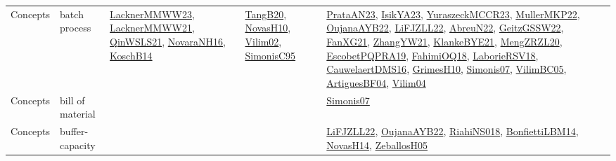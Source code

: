 {\begin{longtable}{lp{3cm}>{\raggedright}p{6cm}>{\raggedright}p{6cm}p{8cm}}
Concepts & batch process & \href{articles/LacknerMMWW23.pdf}{LacknerMMWW23}\cite{LacknerMMWW23}, \href{papers/LacknerMMWW21.pdf}{LacknerMMWW21}\cite{LacknerMMWW21}, \href{articles/QinWSLS21.pdf}{QinWSLS21}\cite{QinWSLS21}, \href{articles/NovaraNH16.pdf}{NovaraNH16}\cite{NovaraNH16}, \href{papers/KoschB14.pdf}{KoschB14}\cite{KoschB14} & \href{papers/TangB20.pdf}{TangB20}\cite{TangB20}, \href{articles/NovasH10.pdf}{NovasH10}\cite{NovasH10}, \href{papers/Vilim02.pdf}{Vilim02}\cite{Vilim02}, \href{papers/SimonisC95.pdf}{SimonisC95}\cite{SimonisC95} & \href{articles/PrataAN23.pdf}{PrataAN23}\cite{PrataAN23}, \href{articles/IsikYA23.pdf}{IsikYA23}\cite{IsikYA23}, \href{articles/YuraszeckMCCR23.pdf}{YuraszeckMCCR23}\cite{YuraszeckMCCR23}, \href{articles/MullerMKP22.pdf}{MullerMKP22}\cite{MullerMKP22}, \href{papers/OujanaAYB22.pdf}{OujanaAYB22}\cite{OujanaAYB22}, \href{papers/LiFJZLL22.pdf}{LiFJZLL22}\cite{LiFJZLL22}, \href{articles/AbreuN22.pdf}{AbreuN22}\cite{AbreuN22}, \href{papers/GeitzGSSW22.pdf}{GeitzGSSW22}\cite{GeitzGSSW22}, \href{articles/FanXG21.pdf}{FanXG21}\cite{FanXG21}, \href{articles/ZhangYW21.pdf}{ZhangYW21}\cite{ZhangYW21}, \href{papers/KlankeBYE21.pdf}{KlankeBYE21}\cite{KlankeBYE21}, \href{articles/MengZRZL20.pdf}{MengZRZL20}\cite{MengZRZL20}, \href{articles/EscobetPQPRA19.pdf}{EscobetPQPRA19}\cite{EscobetPQPRA19}, \href{articles/FahimiOQ18.pdf}{FahimiOQ18}\cite{FahimiOQ18}, \href{articles/LaborieRSV18.pdf}{LaborieRSV18}\cite{LaborieRSV18}, \href{papers/CauwelaertDMS16.pdf}{CauwelaertDMS16}\cite{CauwelaertDMS16}, \href{papers/GrimesH10.pdf}{GrimesH10}\cite{GrimesH10}, \href{articles/Simonis07.pdf}{Simonis07}\cite{Simonis07}, \href{articles/VilimBC05.pdf}{VilimBC05}\cite{VilimBC05}, \href{papers/ArtiguesBF04.pdf}{ArtiguesBF04}\cite{ArtiguesBF04}, \href{papers/Vilim04.pdf}{Vilim04}\cite{Vilim04}\\
Concepts & bill of material &  &  & \href{articles/Simonis07.pdf}{Simonis07}\cite{Simonis07}\\
Concepts & buffer-capacity &  &  & \href{papers/LiFJZLL22.pdf}{LiFJZLL22}\cite{LiFJZLL22}, \href{papers/OujanaAYB22.pdf}{OujanaAYB22}\cite{OujanaAYB22}, \href{papers/RiahiNS018.pdf}{RiahiNS018}\cite{RiahiNS018}, \href{articles/BonfiettiLBM14.pdf}{BonfiettiLBM14}\cite{BonfiettiLBM14}, \href{articles/NovasH14.pdf}{NovasH14}\cite{NovasH14}, \href{articles/ZeballosH05.pdf}{ZeballosH05}\cite{ZeballosH05}\\

\end{longtable}}
